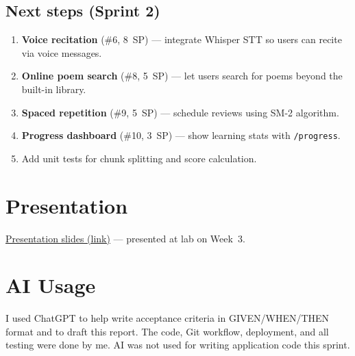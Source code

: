 \documentclass[11pt, a4paper]{article}
\begin{document}
\subsection*{Next steps (Sprint 2)}
\begin{enumerate}
    \item \textbf{Voice recitation} (\#6, 8~SP) --- integrate Whisper STT so users can recite via voice messages.
    \item \textbf{Online poem search} (\#8, 5~SP) --- let users search for poems beyond the built-in library.
    \item \textbf{Spaced repetition} (\#9, 5~SP) --- schedule reviews using SM-2 algorithm.
    \item \textbf{Progress dashboard} (\#10, 3~SP) --- show learning stats with \texttt{/progress}.
    \item Add unit tests for chunk splitting and score calculation.
\end{enumerate}


\section{Presentation}

\href{https://PRESENTATION_SLIDES_LINK_HERE}{Presentation slides (link)} --- presented at lab on Week~3.


\section{AI Usage}

I used ChatGPT to help write acceptance criteria in GIVEN/WHEN/THEN format and to draft this report. The code, Git workflow, deployment, and all testing were done by me. AI was not used for writing application code this sprint.
\end{document}
